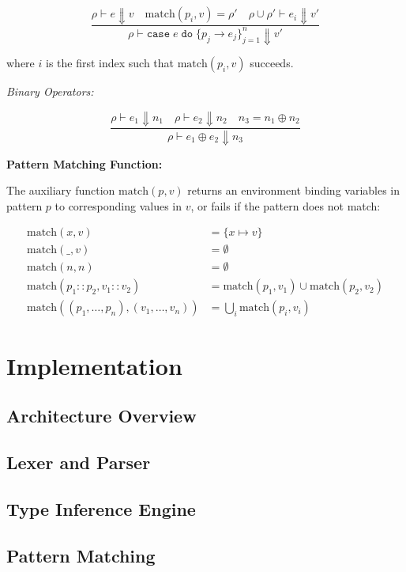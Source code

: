 \documentclass[10pt,letterpaper,twocolumn]{article}
\begin{document}
$$
\frac{\rho \vdash e \Downarrow v \quad \text{match}(p_i, v) = \rho' \quad \rho \cup \rho' \vdash e_i \Downarrow v'}{\rho \vdash \texttt{case}\;e\;\texttt{do}\;\{p_j \to e_j\}^n_{j=1} \Downarrow v'}
$$

where $i$ is the first index such that $\text{match}(p_i, v)$ succeeds.

\textit{Binary Operators:}

$$
\frac{\rho \vdash e_1 \Downarrow n_1 \quad \rho \vdash e_2 \Downarrow n_2 \quad n_3 = n_1 \oplus n_2}{\rho \vdash e_1 \oplus e_2 \Downarrow n_3}
$$

\textbf{Pattern Matching Function:}

The auxiliary function $\text{match}(p, v)$ returns an environment binding variables in pattern $p$ to corresponding values in $v$, or fails if the pattern does not match:

\begin{align*}
\text{match}(x, v) &= \{x \mapsto v\} \\
\text{match}(\_, v) &= \emptyset \\
\text{match}(n, n) &= \emptyset \\
\text{match}(p_1 :: p_2, v_1 :: v_2) &= \text{match}(p_1, v_1) \cup \text{match}(p_2, v_2) \\
\text{match}((p_1, \ldots, p_n), (v_1, \ldots, v_n)) &= \bigcup_i \text{match}(p_i, v_i)
\end{align*}

\section{Implementation}

\subsection{Architecture Overview}


\subsection{Lexer and Parser}


\subsection{Type Inference Engine}


\subsection{Pattern Matching}
\end{document}
